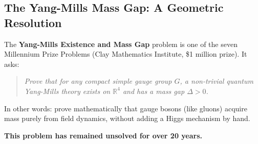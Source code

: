 \subsection{The Yang-Mills Mass Gap: A Geometric Resolution}
\label{subsec:mass_gap}

The \textbf{Yang-Mills Existence and Mass Gap} problem is one of the seven Millennium Prize Problems (Clay Mathematics Institute, \$1 million prize). It asks:

\begin{quote}
\textit{Prove that for any compact simple gauge group $G$, a non-trivial quantum Yang-Mills theory exists on $\mathbb{R}^4$ and has a mass gap $\Delta > 0$.}
\end{quote}

In other words: prove mathematically that gauge bosons (like gluons) acquire mass purely from field dynamics, without adding a Higgs mechanism by hand.

\textbf{This problem has remained unsolved for over 20 years.}

